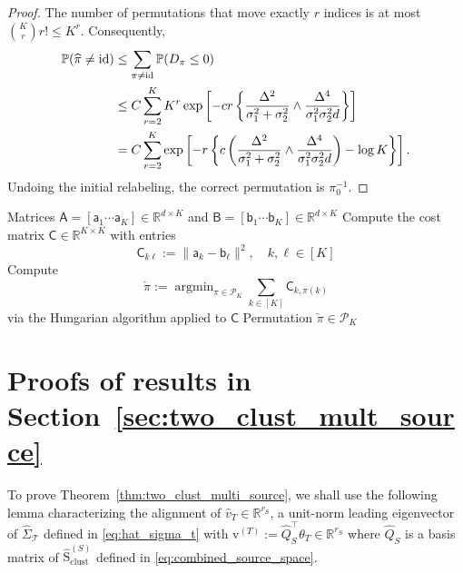 \documentclass[10pt]{article}
\newcommand{\R}{\mathbb R}
\newcommand{\wh}{\widehat}
\DeclareMathOperator{\argmin}{\arg\min}
\newcommand{\calT}{\mathcal T}
\newcommand{\trg}{T}
\newcommand{\thetaT}{\theta_{\trg}}
\newcommand{\rmqv}{\mathrm{v}^{(\trg)}}
\newcommand{\src}{S}
\newcommand{\spclust}{\wh{\mathrm{S}}_{\mathrm{clust}}}
\newcommand{\matchmodule}{\mathsf{HMatch}}
\begin{document}
\begin{proof}
The number of permutations that move exactly $r$ indices is at most $ \binom Kr r! \le K^r.$ Consequently, 
\begin{align} 
\mathbb P(\widehat\pi\neq\mathrm{id}) &\le \sum_{\pi\neq\mathrm{id}} \mathbb P(D_\pi\le0) \notag\\ &\le C\sum_{r=2}^K K^r \exp\left[ -cr \left\{ \frac{\Delta^2}{\sigma_1^2+\sigma_2^2} \wedge \frac{\Delta^4} {\sigma_1^2\sigma_2^2d} \right\} \right] \notag\\ &= C\sum_{r=2}^K \exp\left[ -r\left\{ c\left( \frac{\Delta^2}{\sigma_1^2+\sigma_2^2} \wedge \frac{\Delta^4} {\sigma_1^2\sigma_2^2d} \right) -\log K \right\} \right]. 
\end{align} 
Undoing the initial relabeling, the correct permutation is \(\pi_0^{-1}\).
\end{proof}



\begin{algorithm}[t]
\caption{$\matchmodule$}
\label{alg:hungarian_matching}
\begin{algorithmic}[1]
\Require Matrices $\mathsf{A} = [\mathsf{a}_1 \cdots \mathsf{a}_K] \in \mathbb{R}^{d \times K}$ and $\mathsf{B} = [\mathsf{b}_1 \cdots \mathsf{b}_K] \in \mathbb{R}^{d \times K}$
\State Compute the cost matrix $\mathsf{C} \in \mathbb{R}^{K \times K}$ with entries
\[
    \mathsf{C}_{k\ell} := \|\mathsf{a}_k - \mathsf{b}_\ell\|^2, \quad k, \ell \in [K]
\]
\State Compute
\[
    \check{\pi} := \argmin_{\pi \in \mathcal{P}_K} \sum_{k \in [K]} \mathsf{C}_{k,\pi(k)}
\]
via the Hungarian algorithm applied to $\mathsf{C}$
\Output Permutation $\check{\pi} \in \mathcal{P}_K$
\end{algorithmic}
\end{algorithm}

\fi



\section{Proofs of results in Section~\ref{sec:two_clust_mult_source}}
To prove Theorem~\ref{thm:two_clust_multi_source}, we shall use the following lemma characterizing the alignment of $\wh v_{\trg}\in\R^{r_{\src}}$, a unit-norm leading eigenvector of $\wh{\Sigma}_{\calT}$ defined in \eqref{eq:hat_sigma_t} with $\rmqv:=\wh Q^\top_\src\thetaT \in \R^{r_\src}$ where $\wh Q_\src$ is a basis matrix of $\spclust^{(\src)}$ defined in \eqref{eq:combined_source_space}.
\end{document}

